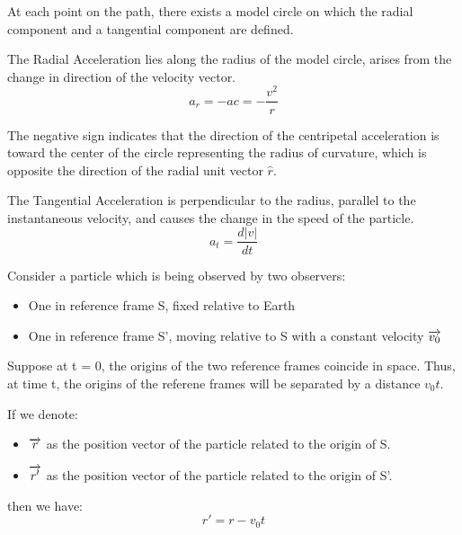             \par At each point on the path, there exists a model circle on which the radial
            component and a tangential component are defined.

            \par The Radial Acceleration lies along the radius of the model circle, arises from
            the change in direction of the velocity vector.
            \begin{equation}
                a_{r} = -a{c} = -\frac{v^{2}}{r}
            \end{equation}
            \par The negative sign indicates that the direction of the centripetal acceleration
            is toward the center of the circle representing the radius of curvature, which
            is opposite the direction of the radial unit vector $\hat{r}$.

        \par The Tangential Acceleration is perpendicular to the radius, parallel to the
        instantaneous velocity, and causes the change in the speed of the particle.
        \begin{equation}
            a_{t} = \frac{d|v|}{dt}
        \end{equation}

    \pagebreak 

        \par Consider a particle which is being observed by two observers:
        \begin{itemize} 
            \item One in reference frame S, fixed relative to Earth
            \item One in reference frame S', moving relative to S with a constant velocity
                $\overrightarrow{v_{0}}$
        \end{itemize} 

        \par Suppose at t = 0, the origins of the two reference frames coincide in space. Thus,
        at time t, the origins of the referene frames will be separated by a distance
        $v_{0}t$.
        \par If we denote:
        \begin{itemize}
            \item $\overrightarrow{r}$ as the position vector of the particle related to the origin of S.
            \item $\overrightarrow{r'}$ as the position vector of the particle related to the origin of S'.
        \end{itemize} 
        \par then we have:
        \begin{equation}
        \label{eq:06}
            r' = r - v_{0}t
        \end{equation}

